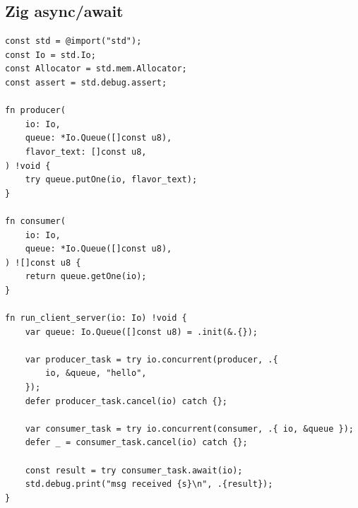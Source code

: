 \subsection{Zig async/await}\label{appx:zig}

\begin{lstlisting}[language=Zig]
const std = @import("std");
const Io = std.Io;
const Allocator = std.mem.Allocator;
const assert = std.debug.assert;

fn producer(
    io: Io,
    queue: *Io.Queue([]const u8),
    flavor_text: []const u8,
) !void {
    try queue.putOne(io, flavor_text);
}

fn consumer(
    io: Io,
    queue: *Io.Queue([]const u8),
) ![]const u8 {
    return queue.getOne(io);
}

fn run_client_server(io: Io) !void {
    var queue: Io.Queue([]const u8) = .init(&.{});

    var producer_task = try io.concurrent(producer, .{
        io, &queue, "hello",
    });
    defer producer_task.cancel(io) catch {};

    var consumer_task = try io.concurrent(consumer, .{ io, &queue });
    defer _ = consumer_task.cancel(io) catch {};

    const result = try consumer_task.await(io);
    std.debug.print("msg received {s}\n", .{result});
}
\end{lstlisting}
